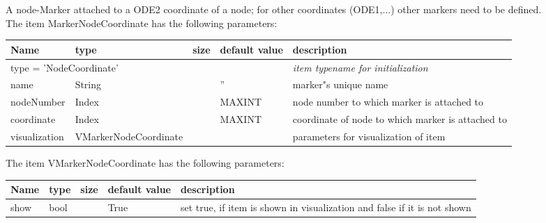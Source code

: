 A node-Marker attached to a ODE2 coordinate of a node; for other coordinates (ODE1,...) other markers need to be defined.
 \\The item MarkerNodeCoordinate has the following parameters:
\begin{center}
  \footnotesize
  \begin{longtable}{| p{4.5cm} | p{2.5cm} | p{0.5cm} | p{2.5cm} | p{6cm} |}
    \hline
    \bf Name & \bf type & \bf size & \bf default value & \bf description \\ \hline
    \multicolumn{4}{l}{\parbox{10cm}{type = 'NodeCoordinate'}} & \multicolumn{1}{l}{\parbox{6cm}{\it item typename for initialization}}\\ \hline
    name &     String &      &     '' &     marker"s unique name\\ \hline
    nodeNumber &     Index &      &     MAXINT &     node number to which marker is attached to\\ \hline
    coordinate &     Index &      &     MAXINT &     coordinate of node to which marker is attached to\\ \hline
    visualization & VMarkerNodeCoordinate & & & parameters for visualization of item \\ \hline
	  \end{longtable}
	\end{center}
The item VMarkerNodeCoordinate has the following parameters:
\begin{center}
  \footnotesize
  \begin{longtable}{| p{4.5cm} | p{2.5cm} | p{0.5cm} | p{2.5cm} | p{6cm} |}
    \hline
    \bf Name & \bf type & \bf size & \bf default value & \bf description \\ \hline
    show &     bool &      &     True &     set true, if item is shown in visualization and false if it is not shown\\ \hline
	  \end{longtable}
	\end{center}

